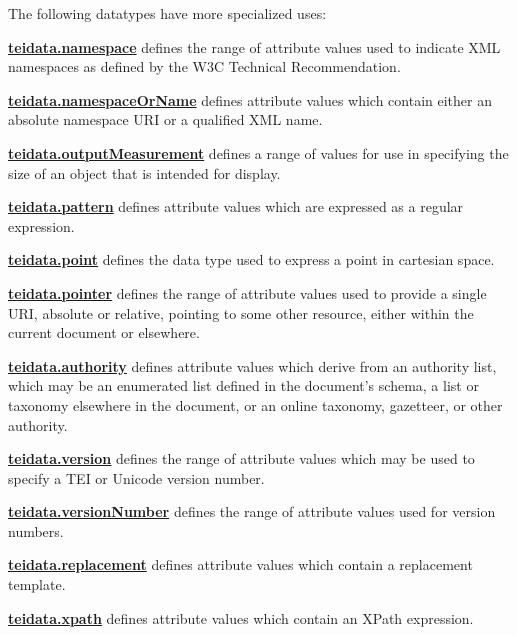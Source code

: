 The following datatypes have more specialized uses: 
\begin{sansreflist}
  
\item {\bfseries \hyperref[TEI.teidata.namespace]{teidata.namespace}} defines the range of attribute values used to indicate XML namespaces as defined by the W3C  Technical Recommendation.
\item {\bfseries \hyperref[TEI.teidata.namespaceOrName]{teidata.namespaceOrName}} defines attribute values which contain either an absolute namespace URI or a qualified XML name.
\item {\bfseries \hyperref[TEI.teidata.outputMeasurement]{teidata.outputMeasurement}} defines a range of values for use in specifying the size of an object that is intended for display.
\item {\bfseries \hyperref[TEI.teidata.pattern]{teidata.pattern}} defines attribute values which are expressed as a regular expression.
\item {\bfseries \hyperref[TEI.teidata.point]{teidata.point}} defines the data type used to express a point in cartesian space.
\item {\bfseries \hyperref[TEI.teidata.pointer]{teidata.pointer}} defines the range of attribute values used to provide a single URI, absolute or relative, pointing to some other resource, either within the current document or elsewhere.
\item {\bfseries \hyperref[TEI.teidata.authority]{teidata.authority}} defines attribute values which derive from an authority list, which may be an enumerated list defined in the document's schema, a list or taxonomy elsewhere in the document, or an online taxonomy, gazetteer, or other authority.
\item {\bfseries \hyperref[TEI.teidata.version]{teidata.version}} defines the range of attribute values which may be used to specify a TEI or Unicode version number.
\item {\bfseries \hyperref[TEI.teidata.versionNumber]{teidata.versionNumber}} defines the range of attribute values used for version numbers.
\item {\bfseries \hyperref[TEI.teidata.replacement]{teidata.replacement}} defines attribute values which contain a replacement template.
\item {\bfseries \hyperref[TEI.teidata.xpath]{teidata.xpath}} defines attribute values which contain an XPath expression.
\end{sansreflist}
